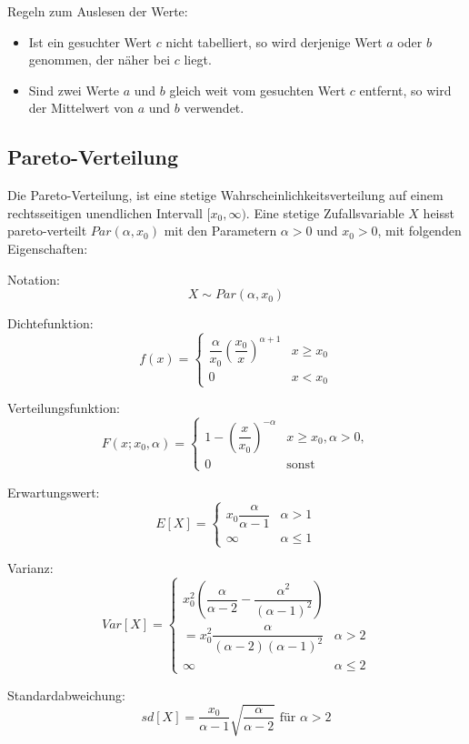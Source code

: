 \documentclass[10pt,a4paper,twocolumn]{article}
\begin{document}
Regeln zum Auslesen der Werte:
\begin{itemize}
\item Ist ein gesuchter Wert $c$ nicht tabelliert, so wird derjenige Wert $a$ oder $b$ genommen, der näher bei $c$ liegt.
\item Sind zwei Werte $a$ und $b$ gleich weit vom gesuchten Wert $c$ entfernt, so wird der Mittelwert von $a$ und $b$ verwendet.
\end{itemize}

\subsection{Pareto-Verteilung}
Die Pareto-Verteilung, ist eine stetige Wahrscheinlichkeitsverteilung auf einem rechtsseitigen unendlichen Intervall $[x_0, \infty)$. Eine stetige Zufallsvariable $X$ heisst pareto-verteilt $Par(\alpha, x_0)$ mit den Parametern $\alpha > 0$ und $x_0 > 0$, mit folgenden Eigenschaften:

\vspace{10pt}

Notation:
\[
X \sim Par(\alpha, x_0)
\]

Dichtefunktion:
\[
f(x) =\begin{cases}
			\dfrac{\alpha}{x_0}\left(\dfrac{x_0}{x}\right)^{\alpha + 1} & x \geq x_0\\
			0 & x < x_0
		\end{cases}
\]

Verteilungsfunktion:
\[
F(x; x_0, \alpha) = \begin{cases}
			1 - \left(\dfrac{x}{x_0}\right)^{-\alpha} & x \geq x_0, \alpha > 0,\\
			0 & \text{sonst}
		\end{cases}
\]

Erwartungswert:
\[
E[X] = \begin{cases}
			x_0\dfrac{\alpha}{\alpha - 1} & \alpha > 1\\
			\infty & \alpha \leq 1
		\end{cases}
\]

Varianz:
\[
Var[X] = \begin{cases}
			x_0^2 \left(\dfrac{\alpha}{\alpha - 2} - \dfrac{\alpha^2}{(\alpha - 1)^2}\right)\\
			= x_0^2 \dfrac{\alpha}{(\alpha - 2)(\alpha - 1)^2} & \alpha > 2\\
			\infty & \alpha \leq 2
		\end{cases}
\]

Standardabweichung:
\[
sd[X]=\dfrac{x_0}{\alpha - 1}\sqrt{\dfrac{\alpha}{\alpha - 2}} \text{ für } \alpha > 2
\]
\end{document}
